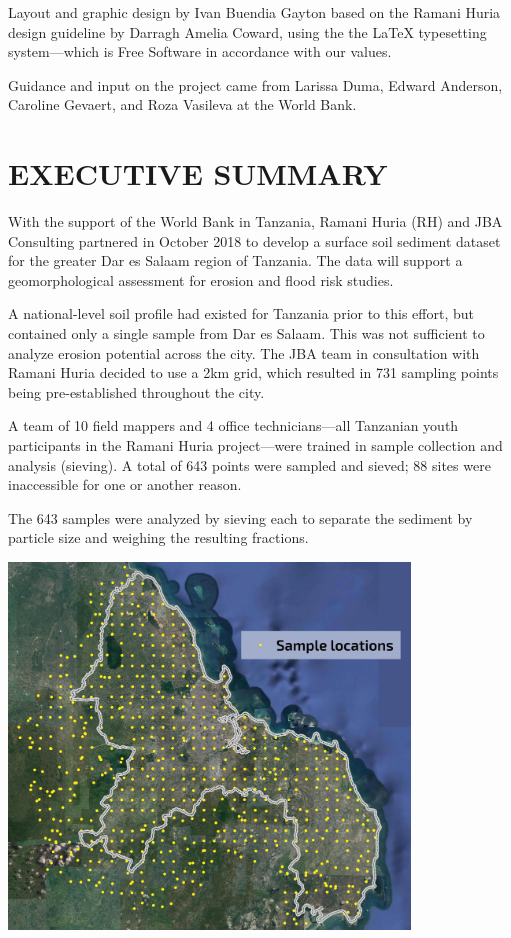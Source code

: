 \documentclass[a4paper,12pt,twoside]{article}
\begin{document}
Layout and graphic design by Ivan Buendia Gayton based on the Ramani Huria design guideline by Darragh Amelia Coward, using the the \LaTeX { } typesetting system---which is Free Software in accordance with our values.

\medskip

Guidance and input on the project came from Larissa Duma, Edward Anderson, Caroline Gevaert, and Roza Vasileva at the World Bank. 

\newpage

\tableofcontents


\newpage
\color{RHblue}
\section{EXECUTIVE SUMMARY}
\label{executivesummary}

\color{RHgrey}
\begin{multicols}{2}
With the support of the World Bank in Tanzania, Ramani Huria (RH) and JBA Consulting partnered in October 2018 to develop a surface soil sediment dataset for the greater Dar es Salaam region of Tanzania. The data will support a geomorphological assessment for erosion and flood risk studies. 

A national-level soil profile had existed for Tanzania prior to this effort, but contained only a single sample from Dar es Salaam. This was not sufficient to analyze erosion potential across the city. The JBA team in consultation with Ramani Huria decided to use a 2km grid, which resulted in 731 sampling points being pre-established throughout the city.

A team of 10 field mappers and 4 office technicians---all Tanzanian youth participants in the Ramani Huria project---were trained in sample collection and analysis (sieving). A total of 643 points were sampled and sieved; 88 sites were inaccessible for one or another reason.

The 643 samples were analyzed by sieving each to separate the sediment by particle size and weighing the resulting fractions.

\end{multicols}

\includegraphics[width=0.8\textwidth]{sample_locations.jpg}
\end{document}

